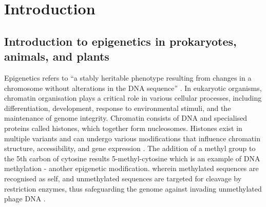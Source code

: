 
\chapter{Introduction}  %

\ifpdf
    \graphicspath{{Chapter1/Figs/Raster/}{Chapter1/Figs/PDF/}{Chapter1/Figs/}}
\else
    \graphicspath{{Chapter1/Figs/Vector/}{Chapter1/Figs/}}
\fi


\section{Introduction to epigenetics in prokaryotes, animals, and plants } %

Epigenetics refers to “a stably heritable phenotype resulting from changes in a chromosome without alterations in the DNA sequence” \citep{RN135}. In eukaryotic organisms, chromatin organisation plays a critical role in various cellular processes, including differentiation, development, response to environmental stimuli, and the maintenance of genome integrity. Chromatin consists of DNA and specialised proteins called histones, which together form nucleosomes. Histones exist in multiple variants and can undergo various modifications that influence chromatin structure, accessibility, and gene expression \citep{RN289,RN284}. The addition of a methyl group to the 5th carbon of cytosine results 5-methyl-cytosine which is an example of DNA methylation - another epigenetic modification. wherein methylated sequences are recognised as self, and unmethylated sequences are targeted for cleavage by restriction enzymes, thus safeguarding the genome against invading unmethylated phage DNA \citep{RN96,RN95}.


